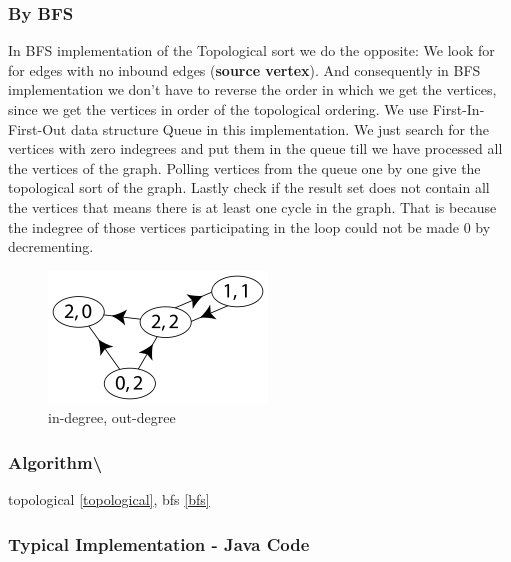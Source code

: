 \documentclass[]{book}
\begin{document}
\subsubsection{By BFS}

In BFS implementation of the Topological sort we do the opposite: We look for for edges with no inbound edges
(\textbf{source vertex}). And consequently in BFS implementation we don't have to reverse the order in which we get the
vertices, since we get the vertices in order of the topological ordering. We use First-In-First-Out data structure
Queue in this implementation. We just search for the vertices with zero indegrees and put them in the queue till
we have processed all the vertices of the graph. Polling vertices from the queue one by one give the topological sort
of the graph. Lastly check if the result set does not contain all the vertices that means there is at least one cycle
in the graph. That is because the indegree of those vertices participating in the loop could not be made 0 by
decrementing.

\begin{figure}
\centering
\includegraphics{img/graph_dag_degrees.png}
\caption{in-degree, out-degree}
\end{figure}

\hypertarget{algorithm-103}{%
\subsubsection{Algorithm\textbackslash{}}\label{algorithm-103}}

topological \ref{topological}, bfs \ref{bfs}

\subsubsection{Typical Implementation - Java Code}
\end{document}
